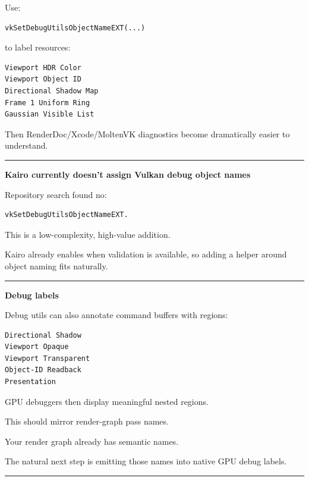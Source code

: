 Use:

\begin{verbatim}
vkSetDebugUtilsObjectNameEXT(...)
\end{verbatim}

to label resources:

\begin{verbatim}
Viewport HDR Color
Viewport Object ID
Directional Shadow Map
Frame 1 Uniform Ring
Gaussian Visible List
\end{verbatim}

Then RenderDoc/Xcode/MoltenVK diagnostics become dramatically easier to understand.

\begin{center}\rule{0.5\linewidth}{0.5pt}\end{center}

\textbf{Kairo currently doesn't assign Vulkan debug object names}

Repository search found no:

\begin{verbatim}
vkSetDebugUtilsObjectNameEXT.
\end{verbatim}

This is a low-complexity, high-value addition.

Kairo already enables  when validation is available, so adding a helper around object naming fits naturally.

\begin{center}\rule{0.5\linewidth}{0.5pt}\end{center}

\textbf{Debug labels}

Debug utils can also annotate command buffers with regions:

\begin{verbatim}
Directional Shadow
Viewport Opaque
Viewport Transparent
Object-ID Readback
Presentation
\end{verbatim}

GPU debuggers then display meaningful nested regions.

This should mirror render-graph pass names.

Your render graph already has semantic names.

The natural next step is emitting those names into native GPU debug labels.

\begin{center}\rule{0.5\linewidth}{0.5pt}\end{center}

